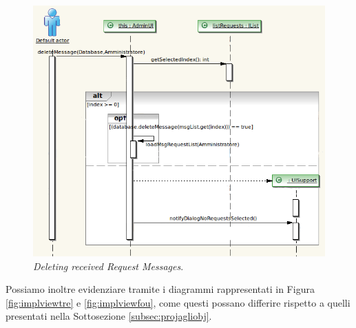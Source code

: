 \begin{figure}
\centering
\includegraphics[scale=0.5]{lastdiagrs/admin_ui_delete_message}
\caption{\textit{Deleting received Request Messages}.}
\label{fig:implviewfou}
\end{figure}
Possiamo inoltre evidenziare tramite i diagrammi rappresentati in Figura
\vref{fig:implviewtre} e \vref{fig:implviewfou}, come questi possano differire 
rispetto a quelli presentati nella Sottosezione \vref{subsec:projagliobj}.
